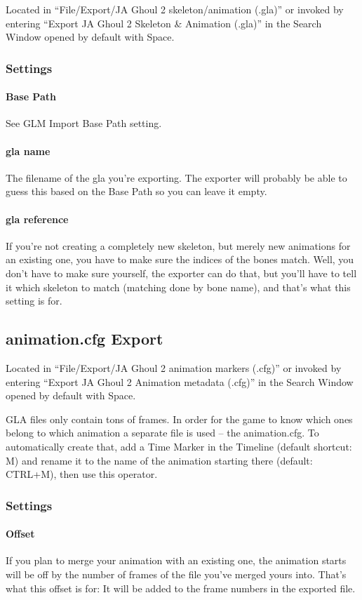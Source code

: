 \documentclass[a4paper,10pt]{article}
\begin{document}
 Located in ``File/Export/JA Ghoul 2 skeleton/animation (.gla)'' or invoked by entering ``Export JA Ghoul 2 
 Skeleton \& Animation (.gla)'' in the Search Window opened by default with Space.
 
 \subsubsection*{Settings}
 
 \paragraph*{Base Path}
 See GLM Import Base Path setting.
 
 \paragraph*{gla name}
 The filename of the gla you're exporting. The exporter will probably be able to guess this based on the
 Base Path so you can leave it empty.
 
 \paragraph*{gla reference}
 If you're not creating a completely new skeleton, but merely new animations for an existing one, you have
 to make sure the indices of the bones match. Well, you don't have to make sure yourself, the exporter can
 do that, but you'll have to tell it which skeleton to match (matching done by bone name), and that's what
 this setting is for.
 
 
 \subsection{animation.cfg Export}
 
 Located in ``File/Export/JA Ghoul 2 animation markers (.cfg)'' or invoked by entering ``Export JA Ghoul 2 
 Animation metadata (.cfg)'' in the Search Window opened by default with Space.
 
 GLA files only contain tons of frames. In order for the game to know which ones belong to which animation
 a separate file is used -- the animation.cfg. To automatically create that, add a Time Marker in the Timeline
 (default shortcut: M) and rename it to the name of the animation starting there (default: CTRL+M), then
 use this operator.
 
 \subsubsection*{Settings}
 
 \paragraph*{Offset}
 If you plan to merge your animation with an existing one, the animation starts will be off by the number of
 frames of the file you've merged yours into. That's what this offset is for: It will be added to the frame
 numbers in the exported file.
 
 
\end{document}
